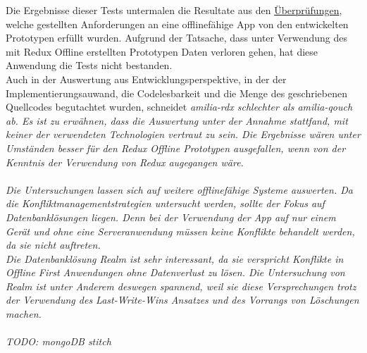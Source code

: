 Die Ergebnisse dieser Tests untermalen die Resultate aus den \hyperref[chap:auswertunganforderungen]{Überprüfungen}, welche gestellten Anforderungen an eine offlinefähige \gls{App} von den entwickelten Prototypen erfüllt wurden.
Aufgrund der Tatsache, dass unter Verwendung des mit Redux Offline erstellten Prototypen Daten verloren gehen, hat diese Anwendung die Tests nicht bestanden.\\
Auch in der Auswertung aus Entwicklungsperspektive, in der der Implementierungsauwand, die Codelesbarkeit und die Menge des geschriebenen Quellcodes begutachtet wurden, schneidet \it{amilia-rdx} schlechter als \it{amilia-qouch} ab.
Es ist zu erwähnen, dass die Auswertung unter der Annahme stattfand, mit keiner der verwendeten Technologien vertraut zu sein.
Die Ergebnisse wären unter Umständen besser für den Redux Offline Prototypen ausgefallen, wenn von der Kenntnis der Verwendung von Redux augegangen wäre.\\\\
%
%
%
Die Untersuchungen lassen sich auf weitere offlinefähige Systeme auswerten.
Da die Konfliktmanagementstrategien untersucht werden, sollte der Fokus auf Datenbanklösungen liegen.
Denn bei der Verwendung der \gls{App} auf nur einem Gerät und ohne eine Serveranwendung müssen keine Konflikte behandelt werden, da sie nicht auftreten.\\
Die Datenbanklösung Realm ist sehr interessant, da sie verspricht Konflikte in Offline First Anwendungen ohne Datenverlust zu lösen.
Die Untersuchung von Realm ist unter Anderem deswegen spannend, weil sie diese Versprechungen trotz der Verwendung des Last-Write-Wins Ansatzes und des Vorrangs von Löschungen machen.\\\\
%
%
%

%
%
%
TODO: mongoDB stitch ~\cite{stitch}